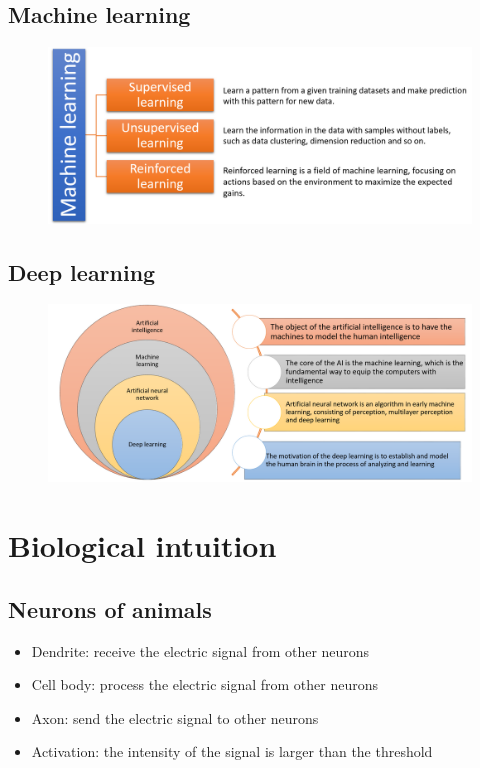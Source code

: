 \subsection{Machine learning}
\begin{figure}[H]
\centering
\includegraphics[width=.9\textwidth]{figures/ML}
\end{figure}



\subsection{Deep learning}
\begin{figure}[H]
\centering
\includegraphics[width=.9\textwidth]{figures/DL}
\end{figure}


\section{Biological intuition}
\subsection{Neurons of animals}

\begin{itemize}
\item Dendrite: receive the electric signal from other neurons

\item Cell body: process the electric signal from other neurons

\item Axon: send the electric signal to other neurons

\item Activation: the intensity of the signal is larger than the threshold


\end{itemize}

